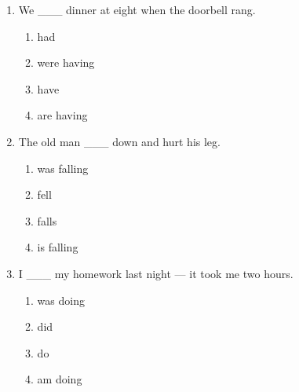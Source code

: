 \documentclass[11pt,a4paper]{ctexart}
\begin{document}
\begin{enumerate}[leftmargin=*,itemsep=4pt]
\begin{enumerate}[label=\Alph*.,leftmargin=2em,itemsep=1pt,topsep=2pt]
\item finishes
\item is finishing
\end{enumerate}
\item We \_\_\_ dinner at eight when the doorbell rang.
\begin{enumerate}[label=\Alph*.,leftmargin=2em,itemsep=1pt,topsep=2pt]
\item had
\item were having
\item have
\item are having
\end{enumerate}
\item The old man \_\_\_ down and hurt his leg.
\begin{enumerate}[label=\Alph*.,leftmargin=2em,itemsep=1pt,topsep=2pt]
\item was falling
\item fell
\item falls
\item is falling
\end{enumerate}
\item I \_\_\_ my homework last night — it took me two hours.
\begin{enumerate}[label=\Alph*.,leftmargin=2em,itemsep=1pt,topsep=2pt]
\item was doing
\item did
\item do
\item am doing
\end{enumerate}
\end{enumerate}
\end{document}
